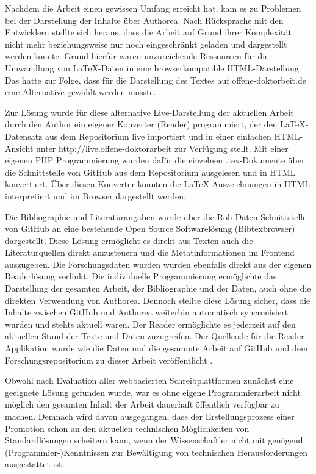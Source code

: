 Nachdem die Arbeit einen gewissen Umfang erreicht hat, kam es zu Problemen bei der Darstellung der Inhalte über Authorea. Nach Rücksprache mit den Entwicklern stellte sich heraus, dass die Arbeit auf Grund ihrer Komplexität nicht mehr beziehungsweise nur noch eingeschränkt geladen und dargestellt werden konnte. Grund hierfür waren unzureichende Ressourcen für die Umwandlung von LaTeX-Daten in eine browserkompatible HTML-Darstellung. Das hatte zur Folge, dass für die Darstellung des Textes auf offene-doktorbeit.de eine Alternative gewählt werden musste.

Zur Lösung wurde für diese alternative Live-Darstellung der aktuellen Arbeit durch den Author ein eigener Konverter (Reader) programmiert, der den LaTeX-Datensatz aus dem Repositorium live importiert und in einer einfachen HTML-Ansicht unter http://live.offene-doktorarbeit zur Verfügung stellt. Mit einer eigenen PHP Programmierung wurden dafür die einzelnen .tex-Dokumente über die Schnittstelle von GitHub aus dem Repositorium ausgelesen und in HTML konvertiert. Über diesen Konverter konnten die LaTeX-Auszeichnungen in HTML interpretiert und im Browser dargestellt werden.

Die Bibliographie und Literaturangaben wurde über die Roh-Daten-Schnittstelle von GitHub an eine bestehende Open Source Softwarelösung (Bibtexbrowser) dargestellt. Diese Lösung ermöglicht es direkt aus Texten auch die Literaturquellen direkt anzusteuern und die Metatinformationen im Frontend auszugeben. Die Forschungsdaten wurden wurden ebenfalls direkt aus der eigenen Readerlösung verlinkt. Die individuelle Programmierung ermöglichte das Darstellung der gesamten Arbeit, der Bibliographie und der Daten, auch ohne die direkten Verwendung von Authorea. Dennoch stellte diese Lösung sicher, dass die Inhalte zwischen GitHub und Authorea weiterhin automatisch syncronisiert wurden und stehts aktuell waren. Der Reader ermöglichte es jederzeit auf den aktuellen Stand der Texte und Daten zuzugreifen. Der Quellcode für die Reader-Applikation wurde wie die Daten und die gesammte Arbeit auf GitHub und dem Forschungsrepositorium zu dieser Arbeit veröffentlicht \cite{heise_2015_reader}.

Obwohl nach Evaluation aller webbasierten Schreibplattformen zunächst eine geeignete Lösung gefunden wurde, war es ohne eigene Programmierarbeit nicht möglich den gesamten Inhalt der Arbeit dauerhaft öffentlich verfügbar zu machen. Demnach wird davon ausgegangen, dass der Erstellungsprozess einer Promotion schon an den aktuellen technischen Möglichkeiten von Standardlösungen scheitern kann, wenn der Wissenschaftler nicht mit genügend (Programmier-)Kenntnissen zur Bewältigung von technischen Herausforderungen ausgestattet ist.


